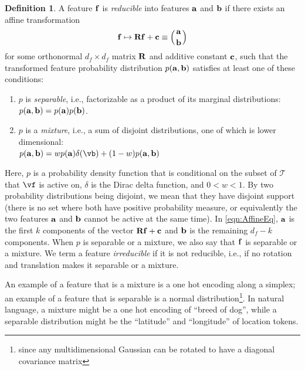 \documentclass{article} %
\DeclareRobustCommand{\revThree}[1]{#1}
\theoremstyle{plain}
\theoremstyle{definition}
\newtheorem{definition}{Definition}
\newcommand{\maxx}[1]{{\color{blue}{\bf Max:} #1}}
\begin{document}
\begin{definition}\label{def:reducible}
    A feature ${\mathbf f}$ is {\it reducible} into features ${\mathbf a}$ and ${\mathbf b}$ if there exists an affine transformation %
    \begin{align}
    \label{eqn:AffineEq}
    {\mathbf f}\mapsto {\mathbf R}{\mathbf f}+{\mathbf c} \equiv \left({{\mathbf a}\atop{\mathbf b}}\right)
    \end{align}
    for some orthonormal $d_f\times d_f$ matrix ${\mathbf R}$ and additive constant ${\mathbf c}$, such that 
    the transformed feature probability distribution $p({\mathbf a},{\mathbf b})$ satisfies at least one of these conditions:
    \begin{enumerate}
        \item $p$ is {\it separable}, i.e., factorizable as a product of its marginal distributions:\\
        $p({\mathbf a},{\mathbf b})=p({\mathbf a})p({\mathbf b})$.
        \item $p$ is a {\it mixture}, i.e., a sum of disjoint distributions, one of which is lower dimensional:\\
        $p(\a,\b)=wp(\a)\delta(\vb) + (1 - w)p(\a, \b)$
    \end{enumerate}
    \revThree{Here, $p$ is a probability density function that is conditional on the subset of $\mathcal{T}$ that $\vf$ is active on,} $\delta$ is the Dirac delta function, and $0 < w < 1$. By two probability distributions being disjoint, we mean that they have disjoint support (there is no set where both have positive probability measure, or equivalently the two features ${\mathbf a}$ and ${\mathbf b}$ cannot be active at the same time). 
    In \cref{eqn:AffineEq}, ${\mathbf a}$ is the first $k$ components of the vector ${\mathbf R}{\mathbf f}+{\mathbf c}$ and ${\mathbf b}$ is the remaining $d_f - k$ components. 
    When $p$ is separable or a mixture, we also say that ${\mathbf f}$ is separable or a mixture. We term a feature {\it irreducible} if it is not reducible, i.e., 
    if no rotation and translation makes it separable or 
    a mixture.
\end{definition}

An example of a feature that is a mixture is a one hot encoding along a simplex; an example of a feature that is separable is a normal distribution\footnote{since any multidimensional Gaussian can be rotated to have a diagonal covariance matrix}. In natural language, a mixture might be a one hot encoding of ``breed of dog'', while a separable distribution might be the ``latitude'' and ``longitude'' of location tokens. 
\end{document}
